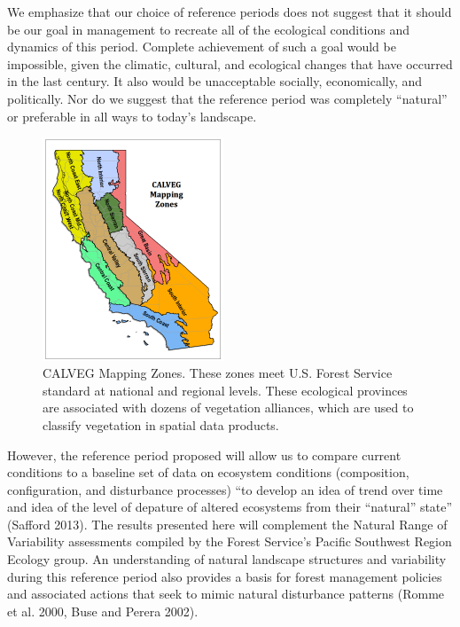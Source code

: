 We emphasize that our choice of reference periods does not suggest that it should be our goal in management to recreate all of the ecological conditions and dynamics of this period. Complete achievement of such a goal would be impossible, given the climatic, cultural, and ecological changes that have occurred in the last century. It also would be unacceptable socially, economically, and politically. Nor do we suggest that the reference period was completely ``natural'' or preferable in all ways to today’s landscape. 

\begin{figure}
\includegraphics[width=0.48\textwidth]{images/CALVEGmappingzones.png}
\caption{CALVEG Mapping Zones. These zones meet U.S. Forest Service standard at national and regional levels. These ecological provinces are associated with dozens of vegetation alliances, which are used to classify vegetation in spatial data products.} 
\label{calveg}
\end{figure}

However, the reference period proposed will allow us to compare current conditions to a baseline set of data on ecosystem conditions (composition, configuration, and disturbance processes) ``to develop an idea of trend over time and idea of the level of depature of altered ecosystems from their ``natural'' state'' (Safford 2013). The results presented here will complement the Natural Range of Variability assessments compiled by the Forest Service's Pacific Southwest Region Ecology group. An understanding of natural landscape structures and variability during this reference period also provides a basis for forest management policies and associated actions that seek to mimic natural disturbance patterns  (Romme et al. 2000, Buse and Perera 2002).

